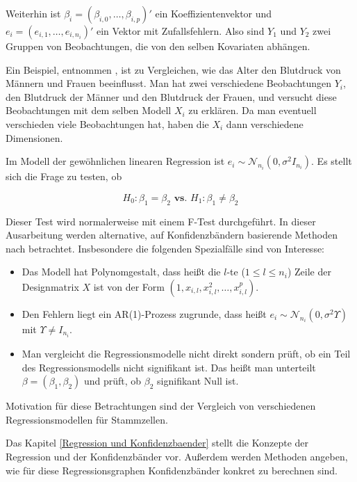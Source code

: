 \documentclass[12pt,a4paper]{article}
\theoremstyle{definition}
\theoremstyle{definition}
\theoremstyle{definition}
\theoremstyle{definition}
\begin{document}
Weiterhin ist $\beta_i = (\beta_{i,0}, \ldots, \beta_{i,p})'$ ein Koeffizientenvektor und  $e_i = (e_{i,1}, \ldots, e_{i,n_i})'$ ein Vektor mit Zufallsfehlern. Also sind $Y_1$ und $Y_2$ zwei Gruppen von Beobachtungen, die von den selben Kovariaten abhängen. 

Ein Beispiel, entnommen \cite[116]{Liu64}, ist zu Vergleichen, wie das Alter den Blutdruck von Männern und Frauen beeinflusst. Man hat zwei verschiedene Beobachtungen $Y_i$, den Blutdruck der Männer und den Blutdruck der Frauen, und versucht diese Beobachtungen mit dem selben Modell $X_i$ zu erklären. Da man eventuell verschieden viele Beobachtungen hat, haben die $X_i$ dann verschiedene Dimensionen.

Im Modell der gewöhnlichen linearen Regression ist $e_i \sim \mathscr{N}_{n_i}(0,\sigma^2 I_{n_i})$. Es stellt sich die Frage zu testen, ob

\begin{equation*}
H_{0} : \beta_{1} = \beta_{2}  \textbf{ vs. }  H_{1} : \beta_{1} \neq \beta_{2}
\end{equation*}

Dieser Test wird normalerweise mit einem F-Test durchgeführt. In dieser Ausarbeitung werden alternative, auf Konfidenzbändern basierende Methoden nach \cite{Liu64} betrachtet. Insbesondere die folgenden Spezialfälle sind von Interesse:

\begin{itemize}
\item Das Modell hat Polynomgestalt, dass heißt die $l$-te ($1 \leq l \leq n_i $) Zeile der Designmatrix $X$ ist von der Form $(1, x_{i,l}, x_{i,l}^2, \ldots, x_{i,l}^p)$.
\item Den Fehlern liegt ein AR(1)-Prozess zugrunde, dass heißt $e_i \sim \mathscr{N}_{n_i}(0,\sigma^2 \Upsilon)$ mit $\Upsilon \neq I_{n_i}$.
\item Man vergleicht die Regressionsmodelle nicht direkt sondern prüft, ob ein Teil des Regressionsmodells nicht signifikant ist. Das heißt man unterteilt $\beta = (\beta_1, \beta_2)$ und prüft, ob $\beta_2$ signifikant Null ist. 
\end{itemize} 

Motivation für diese Betrachtungen sind der Vergleich von verschiedenen Regressionsmodellen für Stammzellen.

Das Kapitel \ref{Regression und Konfidenzbaender} stellt die Konzepte der Regression und der Konfidenzbänder vor. Außerdem werden Methoden angeben, wie für diese Regressionsgraphen Konfidenzbänder konkret zu berechnen sind. 
\end{document}
